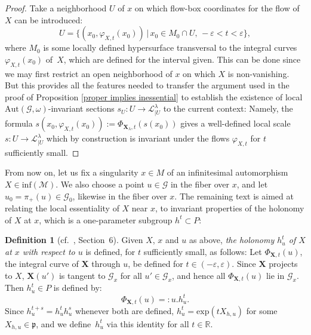 \documentclass[pdftex]{sigma}
\def\R{\mathbb{R}}
\def\p{\mathfrak{p}}
\def\Gbdle{\mathcal{G}}
\theoremstyle{plain}
\theoremstyle{definition}
\newtheorem{Definition}{Definition}[section]
\begin{document}
\begin{proof} Take a neighborhood $U$ of $x$ on which f\/low-box coordinates for the f\/low of $X$ can be introduced:
\[
U = \{(x_0,\varphi_{X,t}(x_0)) \, \vert \, x_0 \in M_0 \cap U, \, -\varepsilon < t < \varepsilon\},
\]
where $M_0$ is some locally def\/ined hypersurface transversal to the integral curves $\varphi_{X,t}(x_0)$ of~$X$, which are def\/ined for the interval given. This can be done since we may f\/irst restrict an open neighborhood of $x$ on which $X$ is non-vanishing. But this provides all the features needed to transfer the argument used in the proof of Proposition \ref{proper implies inessential} to establish the existence of local $\mathrm{Aut}(\Gbdle,\omega)$-invariant sections $s_U: U \rightarrow \mathcal{L}^{\lambda}_{\vert U}$ to the current context: Namely, the formula $s(x_0,\varphi_{X,t}(x_0)) :=  \Phi_{\mathbf{X}_{\lambda},t}(s(x_0))$ gives a well-def\/ined local scale $s: U \rightarrow \mathcal{L}^{\lambda}_{\vert U}$ which by construction is invariant under the f\/lows $\varphi_{X,t}$ for $t$ suf\/f\/iciently small. \end{proof}

From now on, let us f\/ix a singularity $x \in M$ of an inf\/initesimal automorphism $X \in \mathrm{inf}(\mathcal{M})$. We also choose a point $u \in \Gbdle$ in the f\/iber over $x$, and let $u_0 = \pi_+(u) \in \Gbdle_0$, likewise in the f\/iber over $x$. The remaining text is aimed at relating the local essentiality of $X$ near $x$, to invariant properties of the holonomy of $X$ at $x$, which is a one-parameter subgroup $h^t \subset P$:

\begin{Definition}[cf.~\cite{Frances3}, Section~6] \label{holonomy definition} Given $X$, $x$ and $u$ as above, \emph{the holonomy $h_u^t$ of $X$ at $x$ with respect to $u$} is def\/ined, for $t$ suf\/f\/iciently small, as follows: Let $\Phi_{\mathbf{X},t}(u)$, the integral curve of $\mathbf{X}$ through $u$, be def\/ined for $t \in (-\varepsilon,\varepsilon)$. Since $\mathbf{X}$ projects to $X$, $\mathbf{X}(u')$ is tangent to $\Gbdle_x$ for all $u' \in \Gbdle_x$, and hence all $\Phi_{\mathbf{X},t}(u)$ lie in $\Gbdle_x$. Then $h_u^t \in P$ is def\/ined by:
\[
\Phi_{\mathbf{X},t}(u) =: u.h^t_u.
\]
Since $h_u^{t+s} = h_u^th_u^s$ whenever both are def\/ined, $h_u^t = \mathrm{exp}(tX_{h,u})$ for some $X_{h,u} \in \p$, and we def\/ine~$h_u^t$ via this identity for all $t \in \R$.
\end{Definition}
\end{document}
